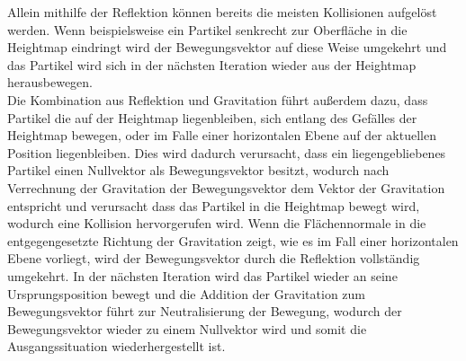 \begin{Spacing}{\mylinespace}
		Allein mithilfe der Reflektion können bereits die meisten Kollisionen
		aufgelöst werden. Wenn beispielsweise ein Partikel senkrecht zur Oberfläche
		in die Heightmap eindringt wird der Bewegungsvektor auf diese Weise umgekehrt
		und das Partikel wird sich in der nächsten Iteration wieder aus der Heightmap
		herausbewegen.
		\\Die Kombination aus Reflektion und Gravitation führt außerdem dazu, dass
		Partikel die auf der Heightmap liegenbleiben, sich entlang des Gefälles
		der Heightmap bewegen, oder im Falle einer horizontalen Ebene auf der aktuellen Position liegenbleiben.
		Dies wird dadurch verursacht, dass ein liegengebliebenes
		Partikel einen Nullvektor als Bewegungsvektor besitzt, wodurch nach Verrechnung der
		Gravitation der Bewegungsvektor dem Vektor der Gravitation entspricht und
		verursacht dass das Partikel in die Heightmap bewegt wird, wodurch eine Kollision hervorgerufen wird.
		Wenn die Flächennormale in die entgegengesetzte Richtung der Gravitation
		zeigt, wie es im Fall einer horizontalen Ebene vorliegt, wird der
		Bewegungsvektor durch die Reflektion vollständig umgekehrt.
		In der nächsten Iteration wird das Partikel wieder an seine
		Ursprungsposition bewegt und die Addition der Gravitation zum Bewegungsvektor führt zur
		Neutralisierung der Bewegung, wodurch der Bewegungsvektor wieder
		zu einem Nullvektor wird und somit die Ausgangssituation wiederhergestellt ist.


\end{Spacing}
